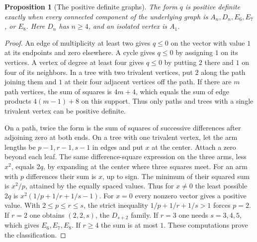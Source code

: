 \documentclass[11pt,oneside,openany]{book}
\newtheorem{proposition}[theorem]{Proposition}
\theoremstyle{definition}
\theoremstyle{remark}
\begin{document}
\begin{proposition}[The positive definite graphs]
\label{res:QU05}
The form \(q\) is positive definite exactly when every connected
component of the underlying graph is \(A_n,D_n,E_6,E_7\), or
\(E_8\). Here \(D_n\) has \(n\ge4\), and an isolated vertex is \(A_1\).
\end{proposition}
\begin{proof}
An edge of multiplicity at least two gives \(q\le0\) on the vector
with value \(1\) at its endpoints and zero elsewhere. A cycle
gives \(q\le0\) by assigning \(1\) on its vertices. A vertex of
degree at least four gives \(q\le0\) by putting \(2\) there and
\(1\) on four of its neighbors. In a tree with two trivalent
vertices, put \(2\) along the path joining them and \(1\) at their
four adjacent vertices off the path. If there are \(m\) path
vertices, the sum of squares is \(4m+4\), which equals the sum of
edge products \(4(m-1)+8\) on this support. Thus only paths and
trees with a single trivalent vertex can be positive definite.

On a path, twice the form is the sum of squares of successive
differences after adjoining zero at both ends. On a tree with one
trivalent vertex, let the arm lengths be \(p-1,r-1,s-1\) in
edges and put \(x\) at the center. Attach a zero beyond each
leaf. The same difference-square expression on the three arms,
less \(x^2\), equals \(2q\), by expanding at the center where
three squares meet. For an arm with \(p\) differences their
sum is \(x\), up to sign. The minimum of their squared sum is
\(x^2/p\), attained by the equally spaced values. Thus for
\(x\ne0\) the least possible \(2q\) is
\(x^2(1/p+1/r+1/s-1)\). For \(x=0\) every nonzero vector gives
a positive value. With \(2\le p\le r\le s\), the strict inequality
\(1/p+1/r+1/s>1\) forces \(p=2\). If \(r=2\) one obtains
\((2,2,s)\), the \(D_{s+2}\) family. If \(r=3\) one needs
\(s=3,4,5\), which gives \(E_6,E_7,E_8\). If \(r\ge4\) the
sum is at most \(1\). These computations prove the classification.
\end{proof}
\end{document}
